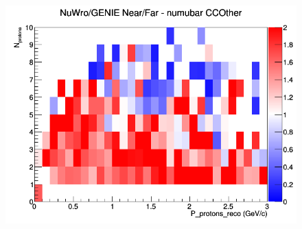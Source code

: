 \begin{figure}[h]
\endminipage
{}
\includegraphics[width=\linewidth]{eff_N_P/FGT/protons/ratios/CCOther_NuWro_GENIE_numubar_NF_N_P.png}
\endminipage
\newline
\end{figure}
\clearpage
